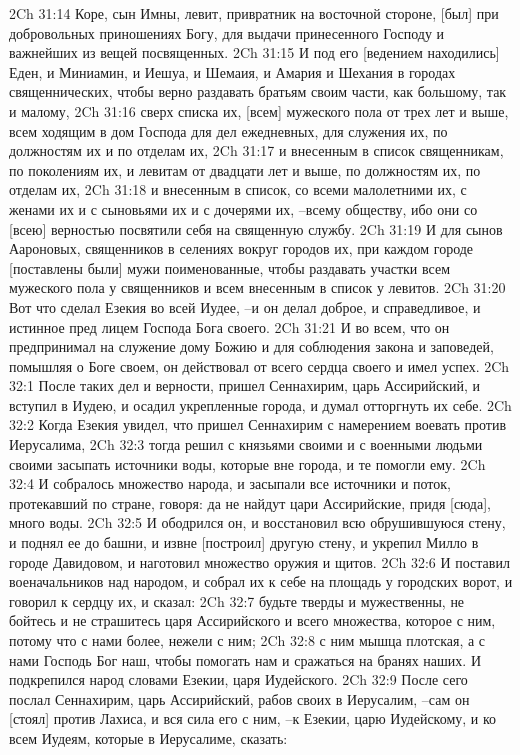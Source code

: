 2Ch 31:14  Коре, сын Имны, левит, привратник на восточной стороне, [был] при добровольных приношениях Богу, для выдачи принесенного Господу и важнейших из вещей посвященных.
2Ch 31:15  И под его [ведением находились] Еден, и Миниамин, и Иешуа, и Шемаия, и Амария и Шехания в городах священнических, чтобы верно раздавать братьям своим части, как большому, так и малому,
2Ch 31:16  сверх списка их, [всем] мужеского пола от трех лет и выше, всем ходящим в дом Господа для дел ежедневных, для служения их, по должностям их и по отделам их,
2Ch 31:17  и внесенным в список священникам, по поколениям их, и левитам от двадцати лет и выше, по должностям их, по отделам их,
2Ch 31:18  и внесенным в список, со всеми малолетними их, с женами их и с сыновьями их и с дочерями их, --всему обществу, ибо они со [всею] верностью посвятили себя на священную службу.
2Ch 31:19  И для сынов Аароновых, священников в селениях вокруг городов их, при каждом городе [поставлены были] мужи поименованные, чтобы раздавать участки всем мужеского пола у священников и всем внесенным в список у левитов.
2Ch 31:20  Вот что сделал Езекия во всей Иудее, --и он делал доброе, и справедливое, и истинное пред лицем Господа Бога своего.
2Ch 31:21  И во всем, что он предпринимал на служение дому Божию и для соблюдения закона и заповедей, помышляя о Боге своем, он действовал от всего сердца своего и имел успех.
2Ch 32:1  После таких дел и верности, пришел Сеннахирим, царь Ассирийский, и вступил в Иудею, и осадил укрепленные города, и думал отторгнуть их себе.
2Ch 32:2  Когда Езекия увидел, что пришел Сеннахирим с намерением воевать против Иерусалима,
2Ch 32:3  тогда решил с князьями своими и с военными людьми своими засыпать источники воды, которые вне города, и те помогли ему.
2Ch 32:4  И собралось множество народа, и засыпали все источники и поток, протекавший по стране, говоря: да не найдут цари Ассирийские, придя [сюда], много воды.
2Ch 32:5  И ободрился он, и восстановил всю обрушившуюся стену, и поднял ее до башни, и извне [построил] другую стену, и укрепил Милло в городе Давидовом, и наготовил множество оружия и щитов.
2Ch 32:6  И поставил военачальников над народом, и собрал их к себе на площадь у городских ворот, и говорил к сердцу их, и сказал:
2Ch 32:7  будьте тверды и мужественны, не бойтесь и не страшитесь царя Ассирийского и всего множества, которое с ним, потому что с нами более, нежели с ним;
2Ch 32:8  с ним мышца плотская, а с нами Господь Бог наш, чтобы помогать нам и сражаться на бранях наших. И подкрепился народ словами Езекии, царя Иудейского.
2Ch 32:9  После сего послал Сеннахирим, царь Ассирийский, рабов своих в Иерусалим, --сам он [стоял] против Лахиса, и вся сила его с ним, --к Езекии, царю Иудейскому, и ко всем Иудеям, которые в Иерусалиме, сказать:
